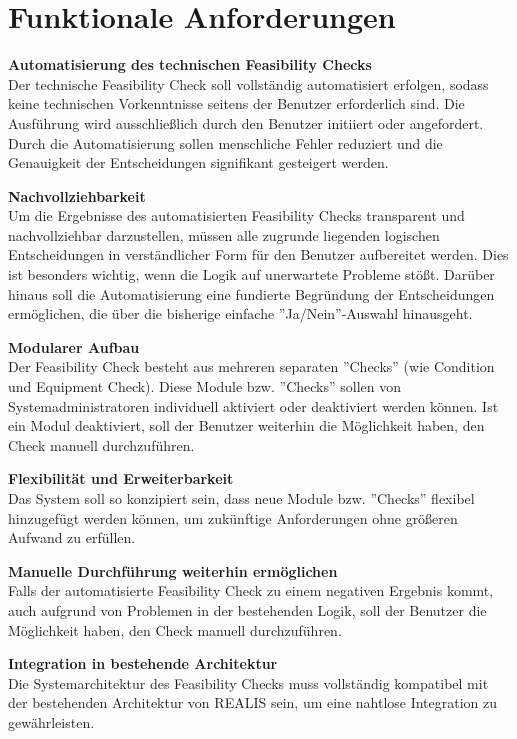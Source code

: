 \section{Funktionale Anforderungen} \label{Sec:funktionale-anforderungen}

\setlength{\leftskip}{1em} 
\textbf{Automatisierung des technischen Feasibility Checks}  \\
Der technische Feasibility Check soll vollständig automatisiert erfolgen, sodass keine technischen Vorkenntnisse seitens der Benutzer erforderlich sind. Die Ausführung wird ausschließlich durch den Benutzer initiiert oder angefordert. Durch die Automatisierung sollen menschliche Fehler reduziert und die Genauigkeit der Entscheidungen signifikant gesteigert werden.

\textbf{Nachvollziehbarkeit}  \\
Um die Ergebnisse des automatisierten Feasibility Checks transparent und nachvollziehbar darzustellen, müssen alle zugrunde liegenden logischen Entscheidungen in verständlicher Form für den Benutzer aufbereitet werden. Dies ist besonders wichtig, wenn die Logik auf unerwartete Probleme stößt. Darüber hinaus soll die Automatisierung eine fundierte Begründung der Entscheidungen ermöglichen, die über die bisherige einfache ''Ja/Nein''-Auswahl hinausgeht.

\textbf{Modularer Aufbau}  \\
Der Feasibility Check besteht aus mehreren separaten ''Checks'' (wie Condition und Equipment Check). Diese Module bzw. ''Checks'' sollen von Systemadministratoren individuell aktiviert oder deaktiviert werden können. Ist ein Modul deaktiviert, soll der Benutzer weiterhin die Möglichkeit haben, den Check manuell durchzuführen.

\textbf{Flexibilität und Erweiterbarkeit}  \\
Das System soll so konzipiert sein, dass neue Module bzw. ''Checks'' flexibel hinzugefügt werden können, um zukünftige Anforderungen ohne größeren Aufwand zu erfüllen.

\textbf{Manuelle Durchführung weiterhin ermöglichen}  \\
Falls der automatisierte Feasibility Check zu einem negativen Ergebnis kommt, auch aufgrund von Problemen in der bestehenden Logik, soll der Benutzer die Möglichkeit haben, den Check manuell durchzuführen.

\textbf{Integration in bestehende Architektur}  \\
Die Systemarchitektur des Feasibility Checks muss vollständig kompatibel mit der bestehenden Architektur von \gls{REALIS} sein, um eine nahtlose Integration zu gewährleisten.

\setlength{\leftskip}{0em} 
